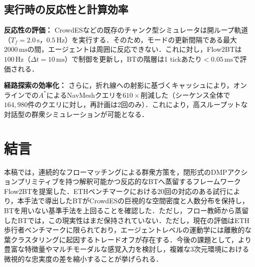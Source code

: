 \documentclass{sice-si}
\begin{document}
\subsection{実行時の反応性と計算効率}
\textbf{反応性の評価：}
CrowdESなどの既存のチャンク型シミュレータは開ループ軌道（$T_f = 2.0\,\text{s}$，$0.5\,\text{Hz}$）を実行する．そのため，モードの更新間隔である最大$2000\,\text{ms}$の間，エージェントは周囲に反応できない．これに対し，Flow2BTは$100\,\text{Hz}$（$\Delta t = 10\,\text{ms}$）で制御を更新し，BTの階層は1 tickあたり$< 0.05\,\text{ms}$で評価される．

\textbf{経路探索の効率化：}
さらに，折れ線への射影に基づくキャッシュにより，オンラインでの$A^*$によるNavMeshクエリを$610\times$削減した（シーケンス全体で$164,980$件のクエリに対し，再計画は2回のみ）．これにより，高スループットな対話型の群衆シミュレーションが可能となる．

\section{結言}
本稿では，連続的なフローマッチングによる群衆方策を，閉形式のDMPアクションプリミティブを持つ解釈可能かつ反応的なBTへ蒸留するフレームワークFlow2BTを提案した．ETHベンチマークにおける20回の対応のある試行により，本手法で導出したBTがCrowdESの巨視的な空間密度と人数分布を保持し，BTを用いない基準手法を上回ることを確認した．ただし，フロー教師から蒸留したBTでは，この現実性はまだ保持されていない．ただし，現在の評価はETH歩行者ベンチマークに限られており，エージェントレベルの運動学には離散的な葉クラスタリングに起因するトレードオフが存在する．今後の課題として，より豊富な特徴量やマルチモーダルな感覚入力を検討し，複雑な3次元環境における微視的な忠実度の差を縮小することが挙げられる．

\end{document}
